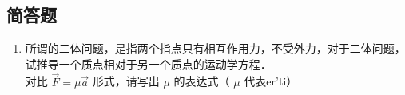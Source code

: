 \subsection{简答题}

\begin{enumerate}

\item 所谓的二体问题，是指两个指点只有相互作用力，不受外力，对于二体问题，试推导一个质点相对于另一个质点的运动学方程．\\
对比 $\vec{F} = \mu \vec{a}$ 形式，请写出 $\mu$ 的表达式（ $\mu$ 代表er'ti）

\end{enumerate}